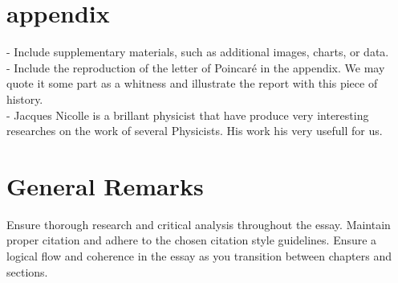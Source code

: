 \documentclass[a4paper,12pt]{report}
\begin{document}
\printbibliography[type=book,heading=subbibliography,title={Books}]
\printbibliography[type=article, heading=subbibliography, title={Articles}]
\printbibliography[type=online,heading=subbibliography, title={Online Resources}]
\printbibliography[type=misc, heading=subbibliography, title={Other Documents}]
\appendix
\section*{\Huge{appendix}}
- Include supplementary materials, such as additional images, charts, or data.\\
- Include the reproduction of the letter of Poincaré in the appendix. We may quote it some part as a whitness and illustrate the report with this piece of history. \\
- Jacques Nicolle is a brillant physicist that have produce very interesting researches on the work of several Physicists. His work his very usefull for us.
\section*{General Remarks}
Ensure thorough research and critical analysis throughout the essay. Maintain proper citation and adhere to the chosen citation style guidelines. Ensure a logical flow and coherence in the essay as you transition between chapters and sections.
\end{document}
